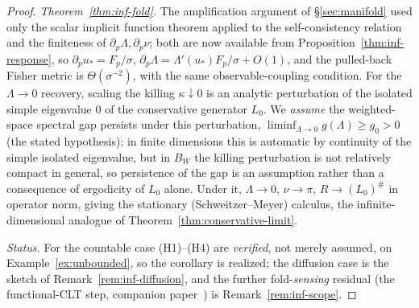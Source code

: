 \documentclass[11pt,reqno]{amsart}
\theoremstyle{plain}
\theoremstyle{definition}
\theoremstyle{remark}
\begin{document}
\begin{proof}
\emph{Theorem~\ref{thm:inf-fold}.} The amplification argument of \S\ref{sec:manifold}
used only the scalar implicit function theorem applied to the self-consistency
relation and the finiteness of $\partial_p\Lambda,\partial_p\nu$; both are now
available from Proposition~\ref{thm:inf-response}, so $\partial_pu_*=F_p/\sigma$,
$\partial_p\Lambda=\Lambda'(u_*)F_p/\sigma+O(1)$, and the pulled-back Fisher metric is
$\Theta(\sigma^{-2})$, with the same observable-coupling condition. For the
$\Lambda\to0$ recovery, scaling the killing $\kappa\downarrow0$ is an analytic
perturbation of the isolated simple eigenvalue $0$ of the conservative generator
$L_0$. We \emph{assume} the weighted-space spectral gap persists under this perturbation,
$\liminf_{\Lambda\to0}g(\Lambda)\ge g_0>0$ (the stated hypothesis): in finite dimensions this is
automatic by continuity of the simple isolated eigenvalue, but in $B_W$ the killing perturbation is
not relatively compact in general, so persistence of the gap is an assumption rather than a
consequence of ergodicity of $L_0$ alone. Under it, $\Lambda\to0$,
$\nu\to\pi$, $R\to(L_0)^{\#}$ in operator norm, giving the stationary (Schweitzer--Meyer) calculus,
the infinite-dimensional analogue of Theorem~\ref{thm:conservative-limit}.

\emph{Status.} For the countable case (H1)--(H4) are \emph{verified}, not merely assumed, on
Example~\ref{ex:unbounded}, so the corollary is realized; the diffusion case is the sketch of
Remark~\ref{rem:inf-diffusion}, and the further fold-\emph{sensing} residual (the functional-CLT step,
companion paper~\cite{SarkarFoldSensing}) is Remark~\ref{rem:inf-scope}.
\end{proof}
\end{document}

